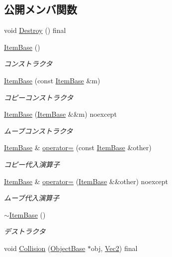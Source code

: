 \subsection*{公開メンバ関数}
\begin{DoxyCompactItemize}
\item 
void \mbox{\hyperlink{class_item_base_ab34d53b8f3442da77466ba1b9132386e}{Destroy}} () final
\item 
\mbox{\hyperlink{class_item_base_af005cade3ceb3329ffecd83956e4b975}{Item\+Base}} ()
\begin{DoxyCompactList}\small\item\em コンストラクタ \end{DoxyCompactList}\item 
\mbox{\hyperlink{class_item_base_a992226bfc15b036f408edf72fa94034b}{Item\+Base}} (const \mbox{\hyperlink{class_item_base}{Item\+Base}} \&m)
\begin{DoxyCompactList}\small\item\em コピーコンストラクタ \end{DoxyCompactList}\item 
\mbox{\hyperlink{class_item_base_a17a7d9d2a649e92dba8d5ee054bf10dd}{Item\+Base}} (\mbox{\hyperlink{class_item_base}{Item\+Base}} \&\&m) noexcept
\begin{DoxyCompactList}\small\item\em ムーブコンストラクタ \end{DoxyCompactList}\item 
\mbox{\hyperlink{class_item_base}{Item\+Base}} \& \mbox{\hyperlink{class_item_base_a94bf9130253e36ba8b1d4019bf5b8a3a}{operator=}} (const \mbox{\hyperlink{class_item_base}{Item\+Base}} \&other)
\begin{DoxyCompactList}\small\item\em コピー代入演算子 \end{DoxyCompactList}\item 
\mbox{\hyperlink{class_item_base}{Item\+Base}} \& \mbox{\hyperlink{class_item_base_a51a498e075511b0817ae827cdf1e3d5b}{operator=}} (\mbox{\hyperlink{class_item_base}{Item\+Base}} \&\&other) noexcept
\begin{DoxyCompactList}\small\item\em ムーブ代入演算子 \end{DoxyCompactList}\item 
\mbox{\hyperlink{class_item_base_aa3ad2e9dc1eb00a7e0e7bac7c4deb302}{$\sim$\+Item\+Base}} ()
\begin{DoxyCompactList}\small\item\em デストラクタ \end{DoxyCompactList}\item 
void \mbox{\hyperlink{class_item_base_ae5c2bcf78c74126a6f76783ca927c7ab}{Collision}} (\mbox{\hyperlink{class_object_base}{Object\+Base}} $\ast$obj, \mbox{\hyperlink{common_8h_ae148fff5818e9444b4ab2288829559bf}{Vec2}}) final
\end{DoxyCompactItemize}
